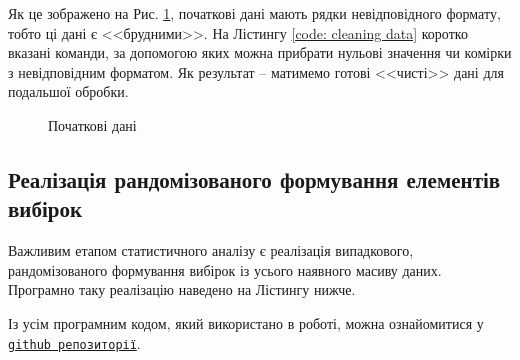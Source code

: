 \newpage


\vspace{0.4cm}
Як це зображено на Рис. \ref{fig:initial data}, початкові дані мають рядки невідповідного формату, 
тобто ці дані є <<брудними>>. На Лістингу \ref{code: cleaning data} коротко вказані команди, за допомогою 
яких можна прибрати нульові значення чи комірки з невідповідним форматом. Як результат -- матимемо готові 
<<чисті>> дані для подальшої обробки. 

\begin{figure}[H]
    \caption{Початкові дані}
    \label{fig:initial data}
\end{figure}



\subsection*{Реалізація рандомізованого формування елементів вибірок}

Важливим етапом статистичного аналізу є реалізація випадкового, рандомізованого формування вибірок із усього 
наявного масиву даних. Програмно таку реалізацію наведено на Лістингу нижче.



\vspace{0.4cm}
Із усім програмним кодом, який використано в роботі, можна ознайомитися у 
\href{https://github.com/Arroneq/Statistical-analysis-of-ZNO-results-2019-PYTHON.git}{\texttt{github репозиторії}}.